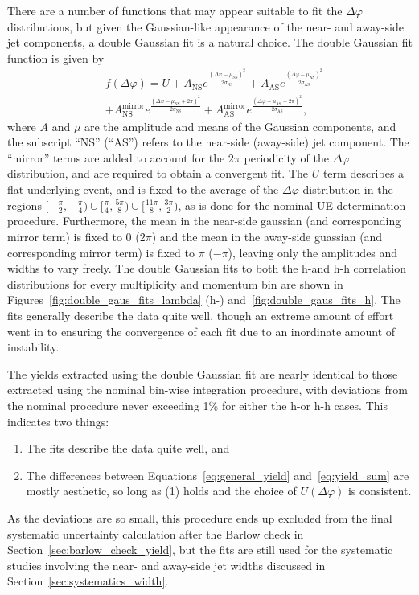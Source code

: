 There are a number of functions that may appear suitable to fit the $\Delta\varphi$ distributions, but given the Gaussian-like appearance of the near- and away-side jet components, a double Gaussian fit is a natural choice. The double Gaussian fit function is given by
%
\begin{equation}
    \label{eq:double_gaus}
    \begin{split}
	&f(\Delta\varphi)  = U + A_{\text{NS}} e^{\frac{(\Delta\varphi - \mu_{\text{NS}})^2}{2\sigma_{\text{NS}}}} + A_{\text{AS}} e^{\frac{(\Delta\varphi - \mu_{\text{AS}})^2}{2\sigma_{\text{AS}}}} \\
    & + A_{\text{NS}}^{\text{mirror}} e^{\frac{(\Delta\varphi - \mu_{\text{NS}} + 2\pi)^2}{2\sigma_{\text{NS}}}} + A_{\text{AS}}^{\text{mirror}} e^{\frac{(\Delta\varphi - \mu_{\text{AS}} - 2\pi)^2}{2\sigma_{\text{AS}}}},
    \end{split}
\end{equation}
%
where $A$ and $\mu$ are the amplitude and means of the Gaussian components, and the subscript ``NS'' (``AS'') refers to the near-side (away-side) jet component. The ``mirror'' terms are added to account for the $2\pi$ periodicity of the $\Delta\varphi$ distribution, and are required to obtain a convergent fit. The $U$ term describes a flat underlying event, and is fixed to the average of the $\Delta\varphi$ distribution in the regions $[-\frac{\pi}{2}, -\frac{\pi}{4}) \cup [\frac{\pi}{4}, \frac{5\pi}{8}) \cup [\frac{11\pi}{8}, \frac{3\pi}{2})$, as is done for the nominal UE determination procedure. Furthermore, the mean in the near-side gaussian (and corresponding mirror term) is fixed to 0 ($2\pi$) and the mean in the away-side guassian (and corresponding mirror term) is fixed to $\pi$ ($-\pi$), leaving only the amplitudes and widths to vary freely. The double Gaussian fits to both the h-\lmb and h-h correlation distributions for every multiplicity and momentum bin are shown in Figures~\ref{fig:double_gaus_fits_lambda} (h-\lmb) and~\ref{fig:double_gaus_fits_h}. The fits generally describe the data quite well, though an extreme amount of effort went in to ensuring the convergence of each fit due to an inordinate amount of instability. 

The yields extracted using the double Gaussian fit are nearly identical to those extracted using the nominal bin-wise integration procedure, with deviations from the nominal procedure never exceeding 1\% for either the h-\lmb or h-h cases. This indicates two things:
%
\begin{enumerate}
    \item The fits describe the data quite well, and
    \item The differences between Equations~\ref{eq:general_yield} and~\ref{eq:yield_sum} are mostly aesthetic, so long as (1) holds and the choice of $U(\Delta\varphi)$ is consistent.
\end{enumerate}
%
As the deviations are so small, this procedure ends up excluded from the final systematic uncertainty calculation after the Barlow check in Section~\ref{sec:barlow_check_yield}, but the fits are still used for the systematic studies involving the near- and away-side jet widths discussed in Section~\ref{sec:systematics_width}.


